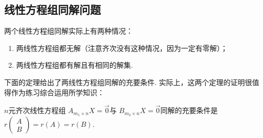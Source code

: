\subsection{线性方程组同解问题}

两个线性方程组同解实际上有两种情况：
\begin{enumerate}
    \item 两线性方程组都无解（注意齐次没有这种情况，因为一定有零解）；

    \item 两线性方程组都有解且有相同的解集.
\end{enumerate}

下面的定理给出了两线性方程组同解的充要条件. 实际上，这两个定理的证明很值得作为练习综合运用所学知识：
\begin{theorem}
    $n$元齐次线性方程组 $A_{m_1 \times n}X=\vec{0}$与 $B_{m_2 \times n}X=\vec{0}$同解的充要条件是$r\begin{pmatrix}
            A \\ B
        \end{pmatrix}=r(A)=r(B)$.
\end{theorem}

